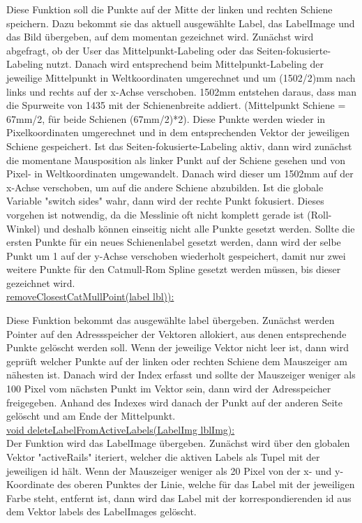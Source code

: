 \documentclass[11pt]{scrartcl}
\begin{document}
\noindent
Diese Funktion soll die Punkte auf der Mitte der linken und rechten Schiene speichern. Dazu bekommt sie das aktuell ausgewählte Label, das LabelImage und das Bild übergeben, auf dem momentan gezeichnet wird. Zunächst wird abgefragt, ob der User das Mittelpunkt-Labeling oder das Seiten-fokusierte-Labeling nutzt. Danach wird entsprechend beim Mittelpunkt-Labeling der jeweilige Mittelpunkt in Weltkoordinaten umgerechnet und um (1502/2)mm nach links und rechts auf der x-Achse verschoben. 1502mm entstehen daraus, dass man die Spurweite von 1435 mit der Schienenbreite addiert. (Mittelpunkt Schiene = 67mm/2, für beide Schienen (67mm/2)*2). Diese Punkte werden wieder in Pixelkoordinaten umgerechnet und in dem entsprechenden Vektor der jeweiligen Schiene gespeichert. Ist das Seiten-fokusierte-Labeling aktiv, dann wird zunächst die momentane Mausposition als linker Punkt auf der Schiene gesehen und von Pixel- in Weltkoordinaten umgewandelt. Danach wird dieser um 1502mm auf der x-Achse verschoben, um auf die andere Schiene abzubilden. Ist die globale Variable "switch sides" wahr, dann wird der rechte Punkt fokusiert. Dieses vorgehen ist notwendig, da die Messlinie oft nicht komplett gerade ist (Roll-Winkel) und deshalb können einseitig nicht alle Punkte gesetzt werden. Sollte die ersten Punkte für ein neues Schienenlabel gesetzt werden, dann wird der selbe Punkt um 1 auf der y-Achse verschoben wiederholt gespeichert, damit nur zwei weitere Punkte für den Catmull-Rom Spline gesetzt werden müssen, bis dieser gezeichnet wird. 
\\

\noindent
\underline{removeClosestCatMullPoint(label lbl)):}


\noindent
Diese Funktion bekommt das ausgewählte label übergeben. Zunächst werden Pointer auf den Adressspeicher der Vektoren allokiert, aus denen entsprechende Punkte gelöscht werden soll. Wenn der jeweilige Vektor nicht leer ist, dann wird geprüft welcher Punkte auf der linken oder rechten Schiene dem Mauszeiger am nähesten ist. Danach wird der Index erfasst und sollte der Mauszeiger weniger als 100 Pixel vom nächsten Punkt im Vektor sein, dann wird der Adresspeicher freigegeben. Anhand des Indexes wird danach der Punkt auf der anderen Seite gelöscht und am Ende der Mittelpunkt.
\\

\noindent
\underline{void deleteLabelFromActiveLabels(LabelImg lblImg):}
\\

\noindent
Der Funktion wird das LabelImage übergeben. Zunächst wird über den globalen Vektor "activeRails" iteriert, welcher die aktiven Labels als Tupel mit der jeweiligen id hält. Wenn der Mauszeiger weniger als 20 Pixel von der x- und y-Koordinate des oberen Punktes der Linie, welche für das Label mit der jeweiligen Farbe steht, entfernt ist, dann wird das Label mit der korrespondierenden id aus dem Vektor labels des LabelImages gelöscht.
\\
\end{document}
